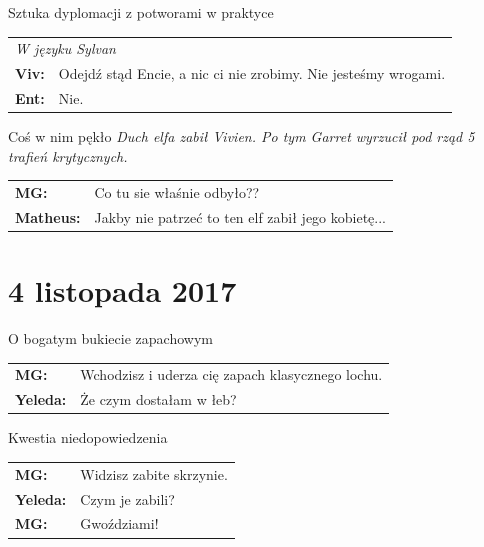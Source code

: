 \documentclass[10pt,twoside,twocolumn]{book}
\begin{document}
\begin{rpg-quotebox}{Sztuka dyplomacji z potworami w praktyce}
   \begin{tabularx}{\columnwidth}{lX}
      \multicolumn{2}{l}{\textit{W języku Sylvan}}\\
      \textbf{Viv:} & Odejdź stąd Encie, a nic ci nie zrobimy. Nie jesteśmy wrogami.\\
      \textbf{Ent:} & Nie.\\
   \end{tabularx}
\end{rpg-quotebox}

\begin{rpg-quotebox}{Coś w nim pękło}
   \textit{Duch elfa zabił Vivien. Po tym Garret wyrzucił pod rząd 5 trafień krytycznych.}\\

   \begin{tabularx}{\columnwidth}{lX}
      \textbf{MG:} & Co tu sie właśnie odbyło??\\
      \textbf{Matheus:} & Jakby nie patrzeć to ten elf zabił jego kobietę...\\
   \end{tabularx}
\end{rpg-quotebox}

\section*{4 listopada 2017}

\begin{rpg-quotebox}{O bogatym bukiecie zapachowym}
   \begin{tabularx}{\columnwidth}{lX}
      \textbf{MG:} & Wchodzisz i uderza cię zapach klasycznego lochu.\\
      \textbf{Yeleda:} & Że czym dostałam w łeb?\\
   \end{tabularx}
\end{rpg-quotebox}

\begin{rpg-quotebox}{Kwestia niedopowiedzenia}
   \begin{tabularx}{\columnwidth}{lX}
      \textbf{MG:} & Widzisz zabite skrzynie.\\
      \textbf{Yeleda:} & Czym je zabili?\\
      \textbf{MG:} & Gwoździami!\\
   \end{tabularx}
\end{rpg-quotebox}
\end{document}
